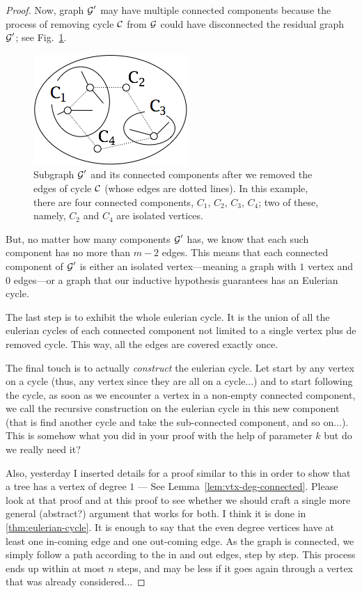 \begin{proof}
Now,  graph $\mbox{$\cal G$}'$ may have multiple connected components because the process of 
removing cycle $\mbox{$\cal C$}$ from $\mbox{$\cal G$}$ could have disconnected the residual graph $\mbox{$\cal G$}'$; see
Fig.~\ref{fig:eulerianProof2}.
\begin{figure}[hbt]
\begin{center}
       \includegraphics[scale=0.5]{FiguresGraph/EulerianProof2}
       \caption{Subgraph $\mbox{$\cal G$}'$ and its connected components after we removed the 
       edges of cycle $\mbox{$\cal C$}$ (whose edges are dotted lines).  In this example, there are
       four connected components, $C_1$, $C_2$, $C_3$, $C_4$; two of these, namely,
       $C_2$ and $C_4$ are isolated vertices.}
  \label{fig:eulerianProof2}
\end{center}
\end{figure}
But, no matter how many components $\mbox{$\cal G$}'$ has, we know that each such component has no
more than $m-2$ edges.  This means that each connected component of $\mbox{$\cal G$}'$ is either an
isolated vertex---meaning a graph with $1$ vertex and $0$ edges---or a graph that our
inductive hypothesis guarantees has an Eulerian cycle.


The last step is to exhibit the whole eulerian cycle.
It is the union of all the eulerian cycles of each connected component not limited to a single vertex
plus de removed cycle.
This way, all the edges are covered exactly once. 

\medskip

The final touch is to actually \textit{construct} the eulerian cycle. 
Let start by any vertex on a cycle (thus, any vertex since they are all on a cycle...)
and to start following the cycle, as soon as we encounter a vertex in a non-empty connected component, 
we call the recursive construction on the eulerian cycle in this new component
(that is find another cycle and take the sub-connected component, and so on...).
{\Denis This is somehow what you did in your proof with the help of parameter $k$ but do we really need it?}

{\Arny Also, yesterday I inserted details for a proof similar to this in order to show that a tree has
a vertex of degree $1$ --- See Lemma~\ref{lem:vtx-deg-connected}.  Please look at that proof and 
at this proof to see whether we should craft  a single more general (abstract?) argument 
that works for both.}
{\Denis I think it is done in \ref{thm:eulerian-cycle}.
It is enough to say that the even degree vertices have at least one in-coming edge and one out-coming edge.
As the graph is connected, we simply follow a path according to the in and out edges, step by step.
This process ends up within at most $n$ steps, and may be less if it goes again through a vertex that was already considered...}


\end{proof}
